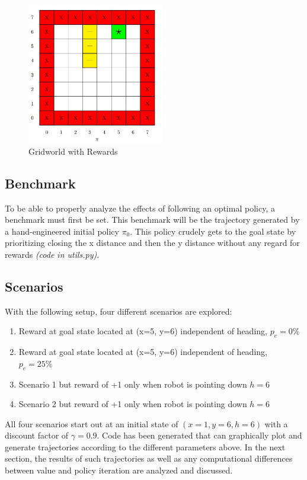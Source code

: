 \documentclass[fullpage]{article}
\begin{document}
\begin{figure}[t!]
\centering
\includegraphics[width=60mm]{images/gridworld.jpg}
\caption{Gridworld with Rewards}
\label{fig:gridworld}
\end{figure}

\subsection{Benchmark}
To be able to properly analyze the effects of following an optimal policy, a benchmark must first be set. This benchmark will be the trajectory generated by a hand-engineered initial policy $\pi_0$. This policy crudely gets to the goal state by prioritizing closing the x distance and then the y distance without any regard for rewards \textit{(code in utils.py)}.

\subsection{Scenarios}
With the following setup, four different scenarios are explored:
\begin{enumerate}
\item Reward at goal state located at (x=5, y=6) independent of heading, $p_e = 0\%$
\item Reward at goal state located at (x=5, y=6) independent of heading, $p_e=25\%$
\item Scenario 1 but reward of +1 only when robot is pointing down $h=6$
\item Scenario 2 but reward of +1 only when robot is pointing down $h=6$
\end{enumerate}
All four scenarios start out at an initial state of $(x=1, y=6, h=6)$ with a discount factor of $\gamma = 0.9$. Code has been generated that can graphically plot and generate trajectories according to the different parameters above. In the next section, the results of such trajectories as well as any computational differences between value and policy iteration are analyzed and discussed.
\end{document}
